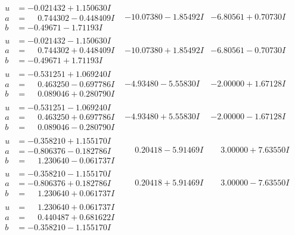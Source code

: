 \documentclass[1p]{elsarticle_modified}
\theoremstyle{definition}
\begin{document}
$$\begin{array}{c|c|c}
\begin{aligned}
u &= -0.021432 + 1.150630 I \\
a &= \phantom{-}0.744302 - 0.448409 I \\
b &= -0.49671 - 1.71193 I\end{aligned}
 & -10.07380 - 1.85492 I & -6.80561 + 0.70730 I \\ \hline\begin{aligned}
u &= -0.021432 - 1.150630 I \\
a &= \phantom{-}0.744302 + 0.448409 I \\
b &= -0.49671 + 1.71193 I\end{aligned}
 & -10.07380 + 1.85492 I & -6.80561 - 0.70730 I \\ \hline\begin{aligned}
u &= -0.531251 + 1.069240 I \\
a &= \phantom{-}0.463250 - 0.697786 I \\
b &= \phantom{-}0.089046 + 0.280790 I\end{aligned}
 & -4.93480 - 5.55830 I & -2.00000 + 1.67128 I \\ \hline\begin{aligned}
u &= -0.531251 - 1.069240 I \\
a &= \phantom{-}0.463250 + 0.697786 I \\
b &= \phantom{-}0.089046 - 0.280790 I\end{aligned}
 & -4.93480 + 5.55830 I & -2.00000 - 1.67128 I \\ \hline\begin{aligned}
u &= -0.358210 + 1.155170 I \\
a &= -0.806376 - 0.182786 I \\
b &= \phantom{-}1.230640 - 0.061737 I\end{aligned}
 & \phantom{-}0.20418 - 5.91469 I & \phantom{-}3.00000 + 7.63550 I \\ \hline\begin{aligned}
u &= -0.358210 - 1.155170 I \\
a &= -0.806376 + 0.182786 I \\
b &= \phantom{-}1.230640 + 0.061737 I\end{aligned}
 & \phantom{-}0.20418 + 5.91469 I & \phantom{-}3.00000 - 7.63550 I \\ \hline\begin{aligned}
u &= \phantom{-}1.230640 + 0.061737 I \\
a &= \phantom{-}0.440487 + 0.681622 I \\
b &= -0.358210 - 1.155170 I\end{aligned}

\end{array}$$
\end{document}
